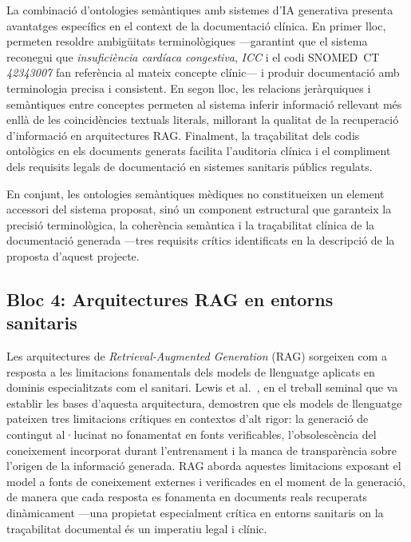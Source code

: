 \documentclass[CAT]{TFUOC}%
\begin{document}
La combinació d'ontologies semàntiques amb sistemes d'IA generativa presenta avantatges específics en el context de la documentació clínica. En primer lloc, permeten resoldre ambigüitats terminològiques ---garantint que el sistema reconegui que \textit{insuficiència cardíaca congestiva}, \textit{ICC} i el codi SNOMED~CT \textit{42343007} fan referència al mateix concepte clínic--- i produir documentació amb terminologia precisa i consistent. En segon lloc, les relacions jeràrquiques i semàntiques entre conceptes permeten al sistema inferir informació rellevant més enllà de les coincidències textuals literals, millorant la qualitat de la recuperació d'informació en arquitectures RAG. Finalment, la traçabilitat dels codis ontològics en els documents generats facilita l'auditoria clínica i el compliment dels requisits legals de documentació en sistemes sanitaris públics regulats.

En conjunt, les ontologies semàntiques mèdiques no constitueixen un element accessori del sistema proposat, sinó un component estructural que garanteix la precisió terminològica, la coherència semàntica i la traçabilitat clínica de la documentació generada ---tres requisits crítics identificats en la descripció de la proposta d'aquest projecte.

\subsection{Bloc 4: Arquitectures RAG en entorns sanitaris}

Les arquitectures de \textit{Retrieval-Augmented Generation} (RAG) sorgeixen com a resposta a les limitacions fonamentals dels models de llenguatge aplicats en dominis especialitzats com el sanitari. Lewis et al.~\cite{lewis2020retrieval}, en el treball seminal que va establir les bases d'aquesta arquitectura, demostren que els models de llenguatge pateixen tres limitacions crítiques en contextos d'alt rigor: la generació de contingut al·lucinat no fonamentat en fonts verificables, l'obsolescència del coneixement incorporat durant l'entrenament i la manca de transparència sobre l'origen de la informació generada. RAG aborda aquestes limitacions exposant el model a fonts de coneixement externes i verificades en el moment de la generació, de manera que cada resposta es fonamenta en documents reals recuperats dinàmicament ---una propietat especialment crítica en entorns sanitaris on la traçabilitat documental és un imperatiu legal i clínic.
\end{document}
